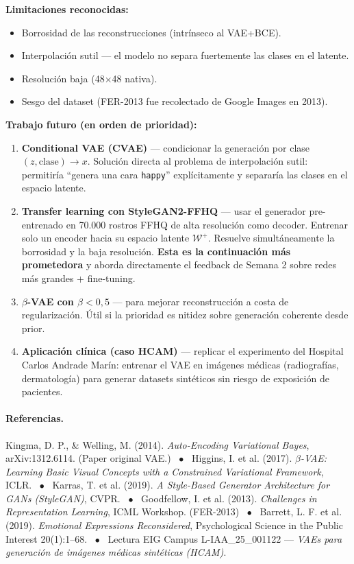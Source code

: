 \documentclass[10pt,a4paper,twocolumn]{article}
\begin{document}
\textbf{Limitaciones reconocidas:}
\begin{itemize}
    \item Borrosidad de las reconstrucciones (intrínseco al VAE+BCE).
    \item Interpolación sutil — el modelo no separa fuertemente las clases en el latente.
    \item Resolución baja (48$\times$48 nativa).
    \item Sesgo del dataset (FER-2013 fue recolectado de Google Images en 2013).
\end{itemize}

\textbf{Trabajo futuro (en orden de prioridad):}

\begin{enumerate}[label=\arabic*.]
    \item \textbf{Conditional VAE (CVAE)} — condicionar la generación por clase $(z, \mathrm{clase}) \to x$. Solución directa al problema de interpolación sutil: permitiría ``genera una cara \texttt{happy}'' explícitamente y separaría las clases en el espacio latente.
    \item \textbf{Transfer learning con StyleGAN2-FFHQ} — usar el generador pre-entrenado en 70.000 rostros FFHQ de alta resolución como decoder. Entrenar solo un encoder hacia su espacio latente $\mathcal{W}^+$. Resuelve simultáneamente la borrosidad y la baja resolución. \textbf{Esta es la continuación más prometedora} y aborda directamente el feedback de Semana 2 sobre redes más grandes + fine-tuning.
    \item \textbf{$\beta$-VAE con $\beta < 0{,}5$} — para mejorar reconstrucción a costa de regularización. Útil si la prioridad es nitidez sobre generación coherente desde prior.
    \item \textbf{Aplicación clínica (caso HCAM)} — replicar el experimento del Hospital Carlos Andrade Marín: entrenar el VAE en imágenes médicas (radiografías, dermatología) para generar datasets sintéticos sin riesgo de exposición de pacientes.
\end{enumerate}

\paragraph{Referencias.}
{\footnotesize
Kingma, D. P., \& Welling, M. (2014). \textit{Auto-Encoding Variational Bayes}, arXiv:1312.6114. (Paper original VAE.) ~$\bullet$~
Higgins, I. et al. (2017). \textit{$\beta$-VAE: Learning Basic Visual Concepts with a Constrained Variational Framework}, ICLR. ~$\bullet$~
Karras, T. et al. (2019). \textit{A Style-Based Generator Architecture for GANs (StyleGAN)}, CVPR. ~$\bullet$~
Goodfellow, I. et al. (2013). \textit{Challenges in Representation Learning}, ICML Workshop. (FER-2013) ~$\bullet$~
Barrett, L. F. et al. (2019). \textit{Emotional Expressions Reconsidered}, Psychological Science in the Public Interest 20(1):1--68. ~$\bullet$~
Lectura EIG Campus L-IAA\_25\_001122 — \textit{VAEs para generación de imágenes médicas sintéticas (HCAM)}.
}
\end{document}
